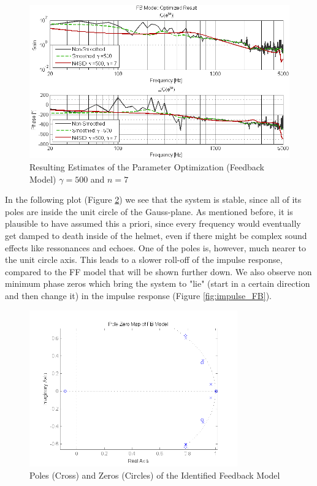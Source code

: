 \begin{figure}[h]
\centering
\includegraphics[width=1.0\textwidth]{pics/results_FB}
\caption{Resulting Estimates of the Parameter Optimization (Feedback Model)  $\gamma = 500$ and $n = 7$}
\label{fig:results_FB}
\end{figure}

In the following plot (Figure \ref{fig:pole_FB}) we see that the system is stable, since all of its poles are inside the unit circle of the Gauss-plane. As mentioned before, it is plausible to have assumed this a priori, since every frequency would eventually get damped to death inside of the helmet, even if there might be complex sound effects like ressonances and echoes. One of the poles is, however, much nearer to the unit circle axis. This leads to a slower roll-off of the impulse response, compared to the FF model that will be shown further down. We also observe non minimum phase zeros which bring the system to "lie" (start in a certain direction and then change it) in the impulse response (Figure \ref{fig:impulse_FB}).\\

\begin{figure}[h]
\centering
\includegraphics[width=0.8\textwidth]{pics/pole_FB}
\caption{Poles (Cross) and Zeros (Circles) of the Identified Feedback Model}
\label{fig:pole_FB}
\end{figure}

